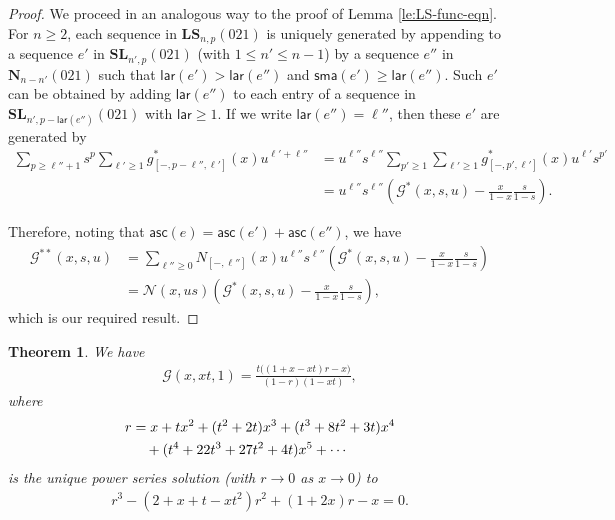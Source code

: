 \documentclass[reqno]{amsart}
\numberwithin{equation}{section}
\theoremstyle{plain}
\newtheorem{theorem}{Theorem}[section]
\theoremstyle{definition}
\theoremstyle{named}
\newcommand{\bN}{\mathbf{N}}
\newcommand{\bSL}{\mathbf{SL}}
\newcommand{\bLS}{\mathbf{LS}}
\newcommand{\asc}{\mathsf{asc}}
\newcommand{\lar}{\mathsf{lar}}
\newcommand{\sma}{\mathsf{sma}}
\newcommand{\cN}{\mathcal{N}}
\newcommand{\cG}{\mathcal{G}}
\newcommand{\coN}{N}
\begin{document}
\begin{proof}
	We proceed in an analogous way to the proof of Lemma \ref{le:LS-func-eqn}. For $n\ge 2$, each sequence in $\bLS_{n,p}(021)$ is uniquely generated by appending to a sequence $e'$ in $\bSL_{n',p}(021)$ (with $1\le n'\le n-1$) by a sequence $e''$ in $\bN_{n-n'}(021)$ such that $\lar(e')>\lar(e'')$ and $\sma(e')\ge \lar(e'')$. Such $e'$ can be obtained by adding $\lar(e'')$ to each entry of a sequence in $\bSL_{n',p-\lar(e'')}(021)$ with $\lar\ge 1$. If we write $\lar(e'')=\ell''$, then these $e'$ are generated by
	\begin{align*}
		\sum_{p\ge \ell''+1}s^p\sum_{\ell'\ge 1}g^*_{[-,p-\ell'',\ell']}(x)u^{\ell'+\ell''}&=u^{\ell''}s^{\ell''}\sum_{p'\ge 1}\sum_{\ell'\ge 1}g^*_{[-,p',\ell']}(x)u^{\ell'}s^{p'}\\
		&=u^{\ell''}s^{\ell''}\left(\cG^*(x,s,u)-\frac{x}{1-x}\frac{s}{1-s}\right).
	\end{align*}
	
	Therefore, noting that $\asc(e)=\asc(e')+\asc(e'')$, we have
	\begin{align*}
		\cG^{**}(x,s,u)&=\sum_{\ell''\ge 0}\coN_{[-,\ell'']}(x)u^{\ell''}s^{\ell''}\left(\cG^*(x,s,u)-\frac{x}{1-x}\frac{s}{1-s}\right)\\
		&=\cN(x,us)\left(\cG^*(x,s,u)-\frac{x}{1-x}\frac{s}{1-s}\right),
	\end{align*}
	which is our required result.
\end{proof}

\begin{theorem}
	We have
	\begin{align}\label{eq:F}
		\cG(x,xt,1)=\frac{t\big((1+x-xt) r-x\big)}{(1-r)(1-xt)},
	\end{align}
	where
	\begin{align}\label{eq:x-expansion}
		r&=x + t x^2 + (t ^2+2 t) x^3 + (t ^3+8 t ^2+3 t) x^4\notag\\
		&\quad + (t ^4+22 t ^3+27 t ^2+4 t) x^5+\cdots
	\end{align}
	is the unique power series solution (with $r\to 0$ as $x\to 0$) to
	\begin{align}\label{eq:kernel-poly}
		r^3-(2+x+t-xt^2)r^2+(1+2x)r-x=0.
	\end{align}
\end{theorem}
\end{document}
